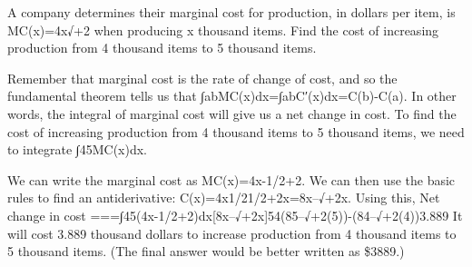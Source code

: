 \begin{example}
A company determines their marginal cost for production, in dollars per item, is MC(x)=4x√+2 when producing x thousand items. Find the cost of increasing production from 4 thousand items to 5 thousand items.

\begin{solution}
  Remember that marginal cost is the rate of change of cost, and so the fundamental theorem tells us that ∫abMC(x)dx=∫abC′(x)dx=C(b)-C(a). In other words, the integral of marginal cost will give us a net change in cost. To find the cost of increasing production from 4 thousand items to 5 thousand items, we need to integrate ∫45MC(x)dx.

We can write the marginal cost as MC(x)=4x-1/2+2. We can then use the basic rules to find an antiderivative:
C(x)=4x1/21/2+2x=8x--√+2x.
Using this,
Net change in cost ===\approx   ∫45(4x-1/2+2)dx[8x--√+2x]54(85–√+2(5))-(84–√+2(4))3.889
It will cost 3.889 thousand dollars to increase production from 4 thousand items to 5 thousand items. (The final answer would be better written as \$3889.)
\end{solution}\end{example}
